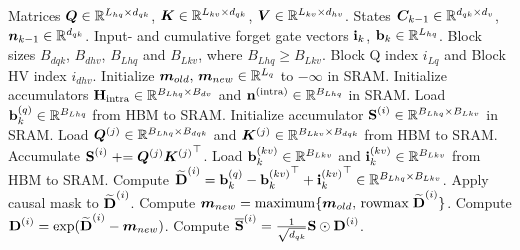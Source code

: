\documentclass{article}
\newcommand{\Hintra}{\bm{\rH}_{\text{intra}}}
\newcommand{\shapeone}[1]{\in \dR^{#1}}
\newcommand{\shapetwo}[2]{\in \dR^{#1 \times #2}}
\begin{document}
        \begin{algorithm}
        \caption{TFLA Intra-Chunk Forward Pass for mLSTMexp ($\bm{\rH}^{(k)}$ Kernel)}
        \label{alg:tfla_mlstm_intra_H}
        \begin{algorithmic}[1]
            \Require Matrices $\BQ \shapetwo{L_{hq}}{d_{qk}}$, $\BK \shapetwo{L_{kv}}{d_{qk}}$, $\BV \shapetwo{L_{kv}}{d_{hv}}$. \newline
            States $\BC_{k-1} \shapetwo{d_{qk}}{d_v}$, $\Bn_{k-1} \shapeone{d_{qk}}$. \newline
            Input- and cumulative forget gate vectors $\bm{\mathrm{i}}_k$, $\bm{\Rb}_k \shapeone{L_{hq}}$. \newline
            Block sizes $B_{dqk}$, $B_{dhv}$, $B_{Lhq}$ and $B_{Lkv}$, where $B_{Lhq} \geq B_{Lkv}$. \newline
            Block Q index $i_{Lq}$ and Block HV index $i_{dhv}$.
            \State Initialize $\bm m_{old}, \, \bm m_{new} \in \mathbb{R}^{L_q}$ to $-\infty$ in SRAM. \newline
            \State Initialize accumulators $\Hintra \shapetwo{B_{Lhq}}{B_{dv}}$ and $\nintra \shapeone{B_{Lhq}}$ in SRAM.
            \State Load $\bm \Rb_k^{(q)} \shapeone{B_{Lhq}}$ from HBM to SRAM.
            \State Initialize accumulator $\bm \rS^{(i)} \shapetwo{B_{Lhq}}{B_{Lkv}}$ in SRAM.
            \State Load $\BQ^{(j)} \shapetwo{B_{Lhq}}{B_{dqk}}$ and $\BK^{(j)} \shapetwo{B_{Lkv}}{B_{dqk}}$ from HBM to SRAM.
            \State Accumulate $\bm {\mathrm{S}}^{(i)} \mathrel{+}= \bm{Q}^{(j)} {\bm{K}^{(j)}}^{\top}$.
            \EndFor
            \State Load $\bm \Rb_k^{(kv)} \shapeone{B_{Lkv}}$ and $\bm \Ri_k^{(kv)} \shapeone{B_{Lkv}}$ from HBM to SRAM.
            \State Compute $\widetilde{\bm \rD}^{(i)} = \bm \Rb_k^{(q)} - {\bm \Rb_k^{(kv)}}^\top + {\bm \Ri_k^{(kv)}}^\top\shapetwo{B_{Lhq}}{B_{Lkv}}$.
            \State Apply causal mask to $\widetilde{\bm {\mathrm{D}}}^{(i)}$.
            \EndIf
            \State Compute $\bm m_{new} = \mathrm{maximum} \{\bm m_{old}, \, \mathrm{rowmax} \; \widetilde{\bm {\mathrm{D}}}^{(i)} \}$.
            \State Compute $\bm {\mathrm{D}}^{(i)} = \exp ( \widetilde{\bm {\mathrm{D}}}^{(i)} - \bm m_{new} )$.
            \State Compute $\overline{\bm {\mathrm{S}}}^{(i)} = \frac{1}{\sqrt{d_{qk}}} \bm {\mathrm{S}} \odot \bm {\mathrm{D}}^{(i)}$.


\end{algorithmic}
\end{algorithm}
\end{document}

